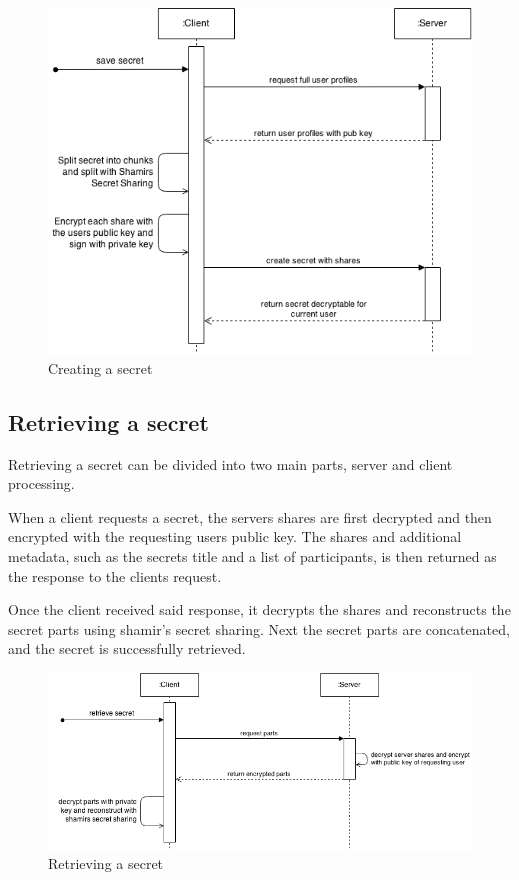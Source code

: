 \begin{figure}
  \includegraphics[scale=0.55]{pictures/create_secret_sequence_diagram.png}
  \caption{Creating a secret}
  \label{fig:creating_a_secret}
\end{figure}

\subsection{Retrieving a secret}

Retrieving a secret can be divided into two main parts, server and client
processing.

When a client requests a secret, the servers shares are first decrypted and
then encrypted with the requesting users public key. The shares and additional
metadata, such as the secrets title and a list of participants, is then
returned as the response to the clients request.

Once the client received said response, it decrypts the shares and reconstructs
the secret parts using shamir's secret sharing. Next the secret parts are
concatenated, and the secret is successfully retrieved.

\begin{figure}
  \includegraphics[scale=0.55]{pictures/retrieve_secret_sequence_diagram.png}
  \caption{Retrieving a secret}
  \label{fig:retrieving_a_secret}
\end{figure}

